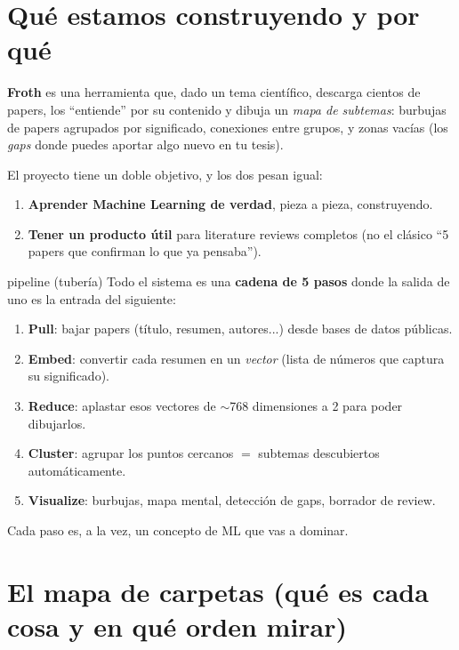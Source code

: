 \documentclass[11pt,a4paper]{article}
\begin{document}

\section{Qué estamos construyendo y por qué}

\textbf{Froth} es una herramienta que, dado un tema científico, descarga cientos de
papers, los ``entiende'' por su contenido y dibuja un \emph{mapa de subtemas}: burbujas
de papers agrupados por significado, conexiones entre grupos, y zonas vacías (los
\emph{gaps} donde puedes aportar algo nuevo en tu tesis).

El proyecto tiene un doble objetivo, y los dos pesan igual:
\begin{enumerate}
  \item \textbf{Aprender Machine Learning de verdad}, pieza a pieza, construyendo.
  \item \textbf{Tener un producto útil} para literature reviews completos (no el
        clásico ``5 papers que confirman lo que ya pensaba'').
\end{enumerate}

\begin{concepto}{pipeline (tubería)}
Todo el sistema es una \textbf{cadena de 5 pasos} donde la salida de uno es la entrada
del siguiente:
\begin{center}
\end{center}
\begin{enumerate}
  \item \textbf{Pull}: bajar papers (título, resumen, autores...) desde bases de datos públicas.
  \item \textbf{Embed}: convertir cada resumen en un \emph{vector} (lista de números que captura su significado).
  \item \textbf{Reduce}: aplastar esos vectores de $\sim$768 dimensiones a 2 para poder dibujarlos.
  \item \textbf{Cluster}: agrupar los puntos cercanos $=$ subtemas descubiertos automáticamente.
  \item \textbf{Visualize}: burbujas, mapa mental, detección de gaps, borrador de review.
\end{enumerate}
Cada paso es, a la vez, un concepto de ML que vas a dominar.
\end{concepto}

\section{El mapa de carpetas (qué es cada cosa y en qué orden mirar)}
\end{document}
